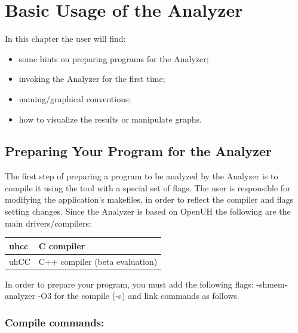 \section{Basic Usage of the \openshmem Analyzer}
\label{chapter:basic-usage}

In this chapter the user will find:

\begin{itemize}
\item some hints on preparing programs for the \openshmem Analyzer;
\item invoking the \openshmem Analyzer for the first time;
\item naming/graphical conventions;
\item how to visualize the results or manipulate graphs.
\end{itemize}

\subsection{Preparing Your Program for the \openshmem Analyzer}

The first step of preparing a program to be analyzed by the \openshmem
Analyzer is to compile it using the tool with a special set of
flags. The user is responsible for modifying the application's
makefiles, in order to reflect the compiler and flags setting
changes. Since the \openshmem Analyzer is based on OpenUH the
following are the main drivers/compilers:

\vspace{0.1in}

\begin{center}
  \begin{tabular}{|l | l |}
    \hline
    uhcc & C compiler \\
    \hline
    uhCC & C++ compiler (beta evaluation) \\
    \hline
  \end{tabular}
\end{center}

\vspace{0.1in}

In order to prepare your program, you must add the following flags:
-shmem-analyzer -O3 for the compile (-c) and link commands as follows.

\subsubsection*{Compile commands:}


